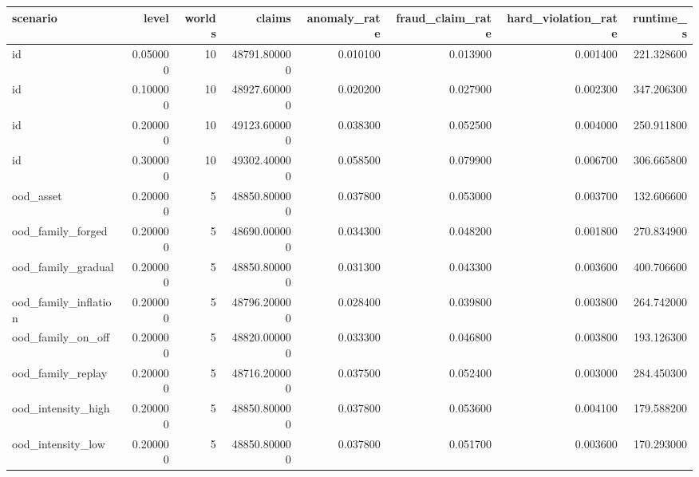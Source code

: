 \begin{tabular}{lrrrrrrr}
\toprule
scenario & level & worlds & claims & anomaly\_rate & fraud\_claim\_rate & hard\_violation\_rate & runtime\_s \\
\midrule
id & 0.050000 & 10 & 48791.800000 & 0.010100 & 0.013900 & 0.001400 & 221.328600 \\
id & 0.100000 & 10 & 48927.600000 & 0.020200 & 0.027900 & 0.002300 & 347.206300 \\
id & 0.200000 & 10 & 49123.600000 & 0.038300 & 0.052500 & 0.004000 & 250.911800 \\
id & 0.300000 & 10 & 49302.400000 & 0.058500 & 0.079900 & 0.006700 & 306.665800 \\
ood\_asset & 0.200000 & 5 & 48850.800000 & 0.037800 & 0.053000 & 0.003700 & 132.606600 \\
ood\_family\_forged & 0.200000 & 5 & 48690.000000 & 0.034300 & 0.048200 & 0.001800 & 270.834900 \\
ood\_family\_gradual & 0.200000 & 5 & 48850.800000 & 0.031300 & 0.043300 & 0.003600 & 400.706600 \\
ood\_family\_inflation & 0.200000 & 5 & 48796.200000 & 0.028400 & 0.039800 & 0.003800 & 264.742000 \\
ood\_family\_on\_off & 0.200000 & 5 & 48820.000000 & 0.033300 & 0.046800 & 0.003800 & 193.126300 \\
ood\_family\_replay & 0.200000 & 5 & 48716.200000 & 0.037500 & 0.052400 & 0.003000 & 284.450300 \\
ood\_intensity\_high & 0.200000 & 5 & 48850.800000 & 0.037800 & 0.053600 & 0.004100 & 179.588200 \\
ood\_intensity\_low & 0.200000 & 5 & 48850.800000 & 0.037800 & 0.051700 & 0.003600 & 170.293000 \\
\bottomrule
\end{tabular}
